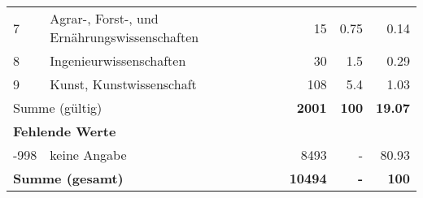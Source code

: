 \begin{longtable}{lXrrr}
     7 &
     \multicolumn{1}{X}{ Agrar-, Forst-, und Ernährungswissenschaften   } &


       \num{15} &
       \num[round-mode=places,round-precision=2]{0,75} &
         \num[round-mode=places,round-precision=2]{0,14} \\

     8 &
     \multicolumn{1}{X}{ Ingenieurwissenschaften   } &


       \num{30} &
       \num[round-mode=places,round-precision=2]{1,5} &
         \num[round-mode=places,round-precision=2]{0,29} \\

     9 &
     \multicolumn{1}{X}{ Kunst, Kunstwissenschaft   } &


       \num{108} &
       \num[round-mode=places,round-precision=2]{5,4} &
         \num[round-mode=places,round-precision=2]{1,03} \\
     \midrule
     \multicolumn{2}{l}{Summe (gültig)} &
       \textbf{\num{2001}} &
     \textbf{100} &
       \textbf{\num[round-mode=places,round-precision=2]{19,07}} \\
     \multicolumn{5}{l}{\textbf{Fehlende Werte}}\\
       -998 &
       keine Angabe &
         \num{8493} &
        - &
         \num[round-mode=places,round-precision=2]{80,93} \\
     \midrule
     \multicolumn{2}{l}{\textbf{Summe (gesamt)}} &
          \textbf{\num{10494}} &
        \textbf{-} &
        \textbf{100} \\
     \bottomrule
     \end{longtable}
     
